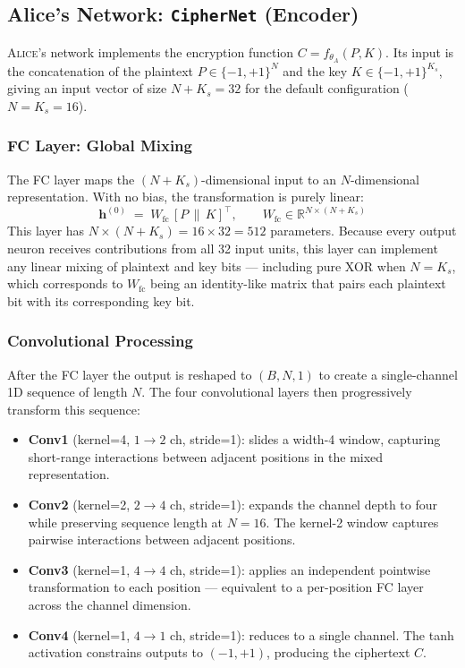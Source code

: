 \documentclass[12pt, a4paper]{article}
\newcommand{\alice}{\textsc{Alice}}
\newcommand{\thetaA}{\theta_{\!A}}
\begin{document}
\subsection{Alice's Network: \texttt{CipherNet} (Encoder)}
\label{subsec:alice_net}

\alice{}'s network implements the encryption function
$C = f_{\thetaA}(P, K)$. Its input is the concatenation of the plaintext
$P \in \{-1,+1\}^N$ and the key $K \in \{-1,+1\}^{K_s}$, giving an input
vector of size $N + K_s = 32$ for the default configuration ($N = K_s = 16$).

\subsubsection*{FC Layer: Global Mixing}

The FC layer maps the $(N+K_s)$-dimensional input to an $N$-dimensional
representation. With no bias, the transformation is purely linear:
%
\begin{equation}
  \mathbf{h}^{(0)} \;=\; W_{\mathrm{fc}}\,[P \,\|\, K]^\top,
  \qquad W_{\mathrm{fc}} \in \mathbb{R}^{N \times (N+K_s)}
  \label{eq:alice_fc}
\end{equation}
%
This layer has $N \times (N + K_s) = 16 \times 32 = 512$ parameters.
Because every output neuron receives contributions from all 32 input units,
this layer can implement any linear mixing of plaintext and key bits ---
including pure XOR when $N = K_s$, which corresponds to $W_{\mathrm{fc}}$
being an identity-like matrix that pairs each plaintext bit with its
corresponding key bit.

\subsubsection*{Convolutional Processing}

After the FC layer the output is reshaped to $(B, N, 1)$ to create a
single-channel 1D sequence of length $N$. The four convolutional layers
then progressively transform this sequence:

\begin{itemize}[leftmargin=1.8em, itemsep=4pt]
  \item \textbf{Conv1} (kernel=4, $1\to2$ ch, stride=1): slides a
        width-4 window, capturing short-range interactions between
        adjacent positions in the mixed representation.
  \item \textbf{Conv2} (kernel=2, $2\to4$ ch, stride=1): expands
        the channel depth to four while preserving sequence length at $N=16$.
        The kernel-2 window captures pairwise interactions between adjacent positions.
  \item \textbf{Conv3} (kernel=1, $4\to4$ ch, stride=1): applies an
        independent pointwise transformation to each position ---
        equivalent to a per-position FC layer across the channel dimension.
  \item \textbf{Conv4} (kernel=1, $4\to1$ ch, stride=1): reduces to a
        single channel. The tanh activation constrains outputs to
        $(-1,+1)$, producing the ciphertext $C$.
\end{itemize}
\end{document}
